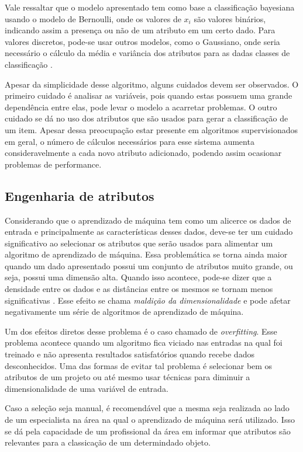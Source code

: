 Vale ressaltar que o modelo apresentado tem como base a classificação
bayesiana usando o modelo de Bernoulli, onde os valores de $x_{i}$ são valores
binários, indicando assim a presença ou não de um atributo em um certo dado.
Para valores discretos, pode-se usar outros modelos, como o Gaussiano, onde
seria necessário o cálculo da média e variância dos atributos para as dadas
classes de classificação \cite{zhang2004optimality}.

Apesar da simplicidade desse algoritmo, alguns cuidados devem ser observados.
O primeiro cuidado é analisar as variáveis, pois quando estas possuem uma grande
dependência entre elas, pode levar o modelo a acarretar problemas. O outro cuidado
se dá no uso dos atributos que são usados para gerar a classificação de um item.
Apesar dessa preocupação estar presente em algoritmos supervisionados em geral,
o número de cálculos necessários para esse sistema aumenta consideravelmente a
cada novo atributo adicionado, podendo assim ocasionar problemas de performance.

\subsection{Engenharia de atributos}

Considerando que o aprendizado de máquina tem como um alicerce os dados de entrada
e principalmente as características desses dados, deve-se ter um cuidado
significativo ao selecionar os atributos que serão usados para alimentar um
algoritmo de aprendizado de máquina. Essa problemática se torna ainda maior
quando um dado apresentado possui um conjunto de atributos muito grande, ou
seja, possui uma dimensão alta. Quando isso acontece, pode-se dizer que a
densidade entre os dados e as distâncias entre os mesmos se tornam menos
significativas \cite{amatriain2011data}. Esse efeito se chama \textit{maldição
da dimensionalidade} e pode afetar negativamente um série de algoritmos de
aprendizado de máquina.

Um dos efeitos diretos desse problema é o caso chamado de \textit{overfitting}.
Esse problema acontece quando um algoritmo fica viciado nas entradas na qual foi
treinado e não apresenta resultados satisfatórios quando recebe dados desconhecidos.
Uma das formas de evitar tal problema é selecionar bem os atributos
de um projeto ou até mesmo usar técnicas para diminuir a dimensionalidade de uma
variável de entrada.

Caso a seleção seja manual, é recomendável que a mesma seja realizada ao lado de
um especialista na área na qual o aprendizado de máquina será utilizado. Isso se
dá pela capacidade de um profissional da área em informar que atributos são
relevantes para a classicação de um determindado objeto.

